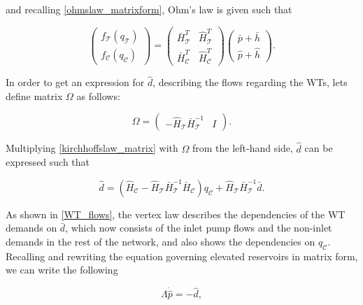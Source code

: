 and recalling \eqref{ohmslaw_matrixform}, Ohm's law is given such that

\begin{equation}
\label{ohmslaw_matrixform11}
 \begin{pmatrix} 
 f_{\mathcal{T}}(q_\mathcal{T}) \\[3pt]
 f_{\mathcal{C}}(q_\mathcal{C}) 
 \end{pmatrix}
 =
 \begin{pmatrix}
   \bar{H}^T_{\mathcal{T}} & \hat{H}^T_{\mathcal{T}} \\[3pt]
   \bar{H}^T_{\mathcal{C}} & \hat{H}^T_{\mathcal{C}} 
   \end{pmatrix}
   \begin{pmatrix} 
 \bar{p} + \bar{h} \\[3pt] 
 \hat{p} + \hat{h} 
 \end{pmatrix}.
\end{equation}

In order to get an expression for $\hat{d}$, describing the flows regarding the WTs, lets define matrix $\Omega$ as follows:

\begin{equation}
\label{omega_matrix}
\Omega
=
\begin{pmatrix} 
 -\hat{H}_{\mathcal{T}}  \bar{H}^{-1}_{\mathcal{T}}  & I  
 \end{pmatrix}.
\end{equation}

Multiplying \eqref{kirchhoffslaw_matrix} with $\Omega$ from the left-hand side, $\hat{d}$ can be expressed such that

\begin{equation}
\label{WT_flows}
\hat{d} = (\hat{H}_{\mathcal{C}} - \hat{H}_{\mathcal{T}} \bar{H}^{-1}_{\mathcal{T}}\bar{H}_{\mathcal{C}})  q_\mathcal{C}  + \hat{H}_{\mathcal{T}} \bar{H}^{-1}_{\mathcal{T}} \bar{d}.
\end{equation}

As shown in \eqref{WT_flows}, the vertex law describes the dependencies of the WT demands on $\bar{d}$, which now consists of the inlet pump flows and the non-inlet demands in the rest of the network, and also shows the dependencies on $q_\mathcal{C}$. Recalling and rewriting the equation governing elevated reservoirs in matrix form, we can write the following

\begin{equation}
\label{WT_matrixform}
\Lambda \dot{\hat{p}} = - \hat{d},
\end{equation}


